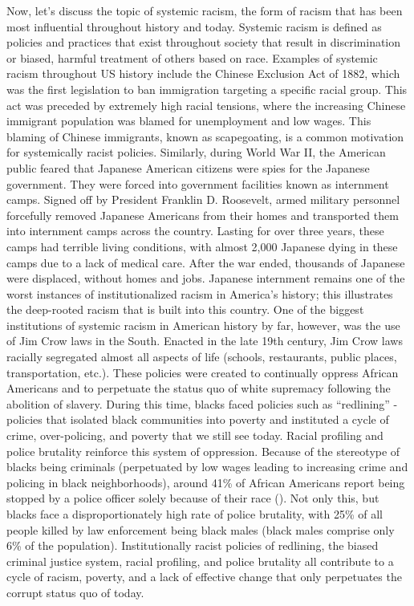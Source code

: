 Now, let's discuss the topic of systemic racism, the form of racism that has been most influential throughout history and today. Systemic racism is defined as policies and practices that exist throughout society that result in discrimination or biased, harmful treatment of others based on race. Examples of systemic racism throughout US history include the Chinese Exclusion Act of 1882, which was the first legislation to ban immigration targeting a specific racial group. This act was preceded by extremely high racial tensions, where the increasing Chinese immigrant population was blamed for unemployment and low wages. This blaming of Chinese immigrants, known as scapegoating, is a common motivation for systemically racist policies. Similarly, during World War II, the American public feared that Japanese American citizens were spies for the Japanese government. They were forced into government facilities known as internment camps. Signed off by President Franklin D. Roosevelt, armed military personnel forcefully removed Japanese Americans from their homes and transported them into internment camps across the country. Lasting for over three years, these camps had terrible living conditions, with almost 2,000 Japanese dying in these camps due to a lack of medical care. After the war ended, thousands of Japanese were displaced, without homes and jobs. Japanese internment remains one of the worst instances of institutionalized racism in America’s history; this illustrates the deep-rooted racism that is built into this country. One of the biggest institutions of systemic racism in American history by far, however, was the use of Jim Crow laws in the South. Enacted in the late 19th century, Jim Crow laws racially segregated almost all aspects of life (schools, restaurants, public places, transportation, etc.). These policies were created to continually oppress African Americans and to perpetuate the status quo of white supremacy following the abolition of slavery. During this time, blacks faced policies such as “redlining” - policies that isolated black communities into poverty and instituted a cycle of crime, over-policing, and poverty that we still see today. Racial profiling and police brutality reinforce this system of oppression. Because of the stereotype of blacks being criminals (perpetuated by low wages leading to increasing crime and policing in black neighborhoods), around 41\% of African Americans report being stopped by a police officer solely because of their race (\cite{stewart2024}). Not only this, but blacks face a disproportionately high rate of police brutality, with 25\% of all people killed by law enforcement being black males (black males comprise only 6\% of the population). Institutionally racist policies of redlining, the biased criminal justice system, racial profiling, and police brutality all contribute to a cycle of racism, poverty, and a lack of effective change that only perpetuates the corrupt status quo of today.

